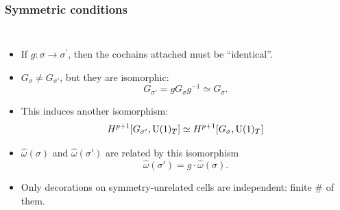 \documentclass[xcolor=table, aspectratio=43,ignorenonframetext]{beamer}
\newcommand{\uone}{\text U(1)}
\begin{document}
\begin{frame}
	\frametitle{Symmetric conditions}
	\begin{columns}
		\begin{itemize}
			\item If $g:\sigma\rightarrow\sigma^\prime$, then the cochains attached must be ``identical''.
			\item $G_\sigma\neq G_{\sigma'}$, but they are isomorphic:
			\[G_{\sigma'}=gG_\sigma g^{-1}\simeq G_\sigma.\]
			\item This induces another isomorphism:
			\[H^{p+1}[G_{\sigma'},\uone_T]\simeq H^{p+1}[G_\sigma,\uone_T]\]
			\item $\hat\omega(\sigma)$ and $\hat\omega(\sigma')$ are related by this isomorphism
			\[\hat\omega(\sigma') = g\cdot \hat\omega(\sigma).\]
			\item Only decorations on symmetry-unrelated cells are independent: finite \# of them.
		\end{itemize}
	\end{columns}
\end{frame}
\end{document}
